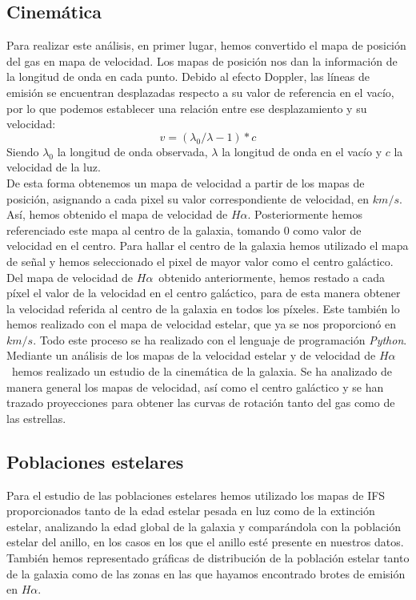 \documentclass{article}
\newcommand{\hal}{$H\alpha$}
\begin{document}
\subsection{Cinemática}
Para realizar este análisis, en primer lugar, hemos convertido el mapa de posición del gas en mapa de velocidad. Los mapas de posición nos dan la información de la longitud de onda en cada punto. Debido al efecto Doppler, las líneas de emisión se encuentran desplazadas respecto a su valor de referencia en el vacío, por lo que podemos establecer una relación entre ese desplazamiento y su velocidad:
\begin{equation}
v=(\lambda_{0}/\lambda - 1)*c \label{ecuacion_1}
\end{equation}
Siendo $\lambda_{0}$ la longitud de onda observada, $\lambda$ la longitud de onda en el vacío y $c$ la velocidad de la luz.\\De esta forma obtenemos un mapa de velocidad a partir de los mapas de posición, asignando a cada pixel su valor correspondiente de velocidad, en $km/s$. Así, hemos obtenido el mapa de velocidad de \hal. Posteriormente hemos referenciado este mapa al centro de la galaxia, tomando 0 como valor de velocidad en el centro. Para hallar el centro de la galaxia hemos utilizado el mapa de señal y hemos seleccionado el pixel de mayor valor como el centro galáctico. Del mapa de velocidad de \hal\ obtenido anteriormente, hemos restado a cada píxel el valor de la velocidad en el centro galáctico, para de esta manera obtener la velocidad referida al centro de la galaxia en todos los píxeles. Este también lo hemos realizado con el mapa de velocidad estelar, que ya se nos proporcionó en $km/s$. Todo este proceso se ha realizado con el lenguaje de programación \emph{Python}.\\Mediante un análisis de los mapas de la velocidad estelar y de velocidad de \hal\ hemos realizado un estudio de la cinemática de la galaxia. Se ha analizado de manera general los mapas de velocidad, así como el centro galáctico y se han trazado proyecciones para obtener las curvas de rotación tanto del gas como de las estrellas.

\subsection{Poblaciones estelares}
Para el estudio de las poblaciones estelares hemos utilizado los mapas de IFS proporcionados tanto de la edad estelar pesada en luz como de la extinción estelar, analizando la edad global de la galaxia y comparándola con la población estelar del anillo, en los casos en los que el anillo esté presente en nuestros datos. También hemos representado gráficas de distribución de la población estelar tanto de la galaxia como de las zonas en las que hayamos encontrado brotes de emisión en \hal. 
\end{document}
